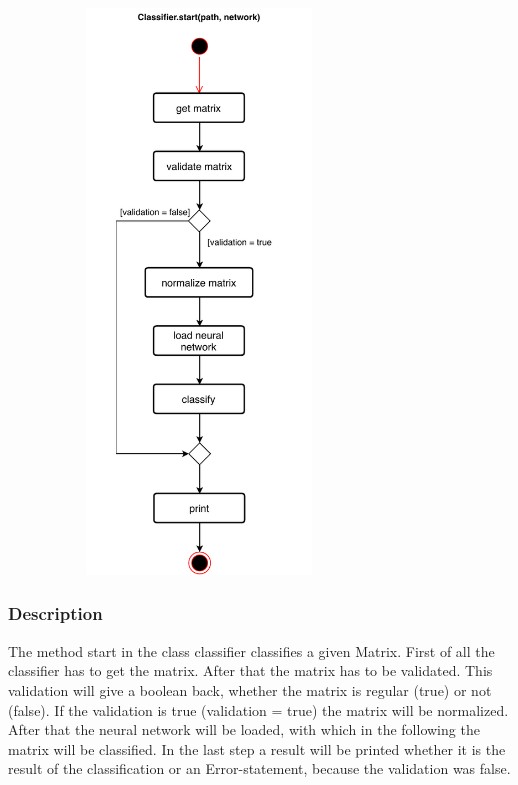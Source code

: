 \documentclass[parskip=full]{scrartcl}
\begin{document}
\begin{figure}[h]
\begin{center}
\includegraphics[width=8cm,height=15cm,keepaspectratio]{ActivityDiagrams/PDF/classification}
\label{Activity Diagrams}
\end{center}
\end{figure}

\newpage
\subsubsection{Description}
The method start in the class classifier classifies a given Matrix.
First of all the classifier has to get the matrix. 
After that the matrix has to be validated.
This validation will give a boolean back, whether the matrix is regular (true) or not (false).
If the validation is true (validation = true) the matrix will be normalized.
After that the \gls{neural network} will be loaded, with which in the following the matrix will be classified.
In the last step a result will be printed whether it is the result of the classification or an Error-statement, because the validation was false.
\end{document}
